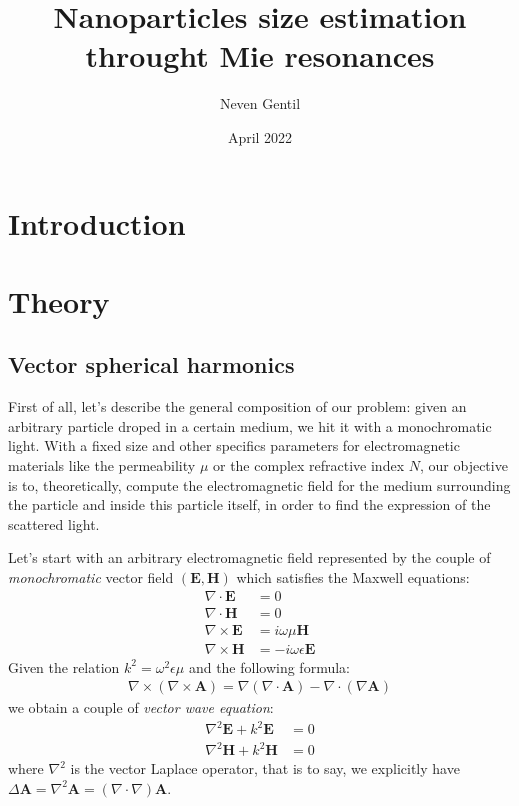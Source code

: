 \documentclass{article}
\title{Nanoparticles size estimation throught Mie resonances}
\author{Neven Gentil}
\date{April 2022}
\numberwithin{equation}{section}
\begin{document}
\maketitle

\twocolumn

\section{Introduction}

\section{Theory}

\subsection{Vector spherical harmonics}

First of all, let's describe the general composition of our problem: given an arbitrary particle droped in a certain medium, we hit it with a monochromatic light. With a fixed size and other specifics parameters for electromagnetic materials like the permeability $\mu$ or the complex refractive index $N$, our objective is to, theoretically, compute the electromagnetic field for the medium surrounding the particle and inside this particle itself, in order to find the expression of the scattered light.

Let's start with an arbitrary electromagnetic field represented by the couple of \textit{monochromatic} vector field $(\textbf{E}, \textbf{H})$ which satisfies the Maxwell equations:
\begin{align}
\nabla \cdot \textbf{E} &= 0\\
\nabla \cdot \textbf{H} &= 0\\
\nabla \times \textbf{E} &= i\omega \mu \textbf{H} \label{eq:rot_e} \\
\nabla \times \textbf{H} &= -i\omega \epsilon \textbf{E} \label{eq:rot_h}
\end{align}
Given the relation $k^{2} = \omega ^{2}\epsilon \mu$ and the following formula:
\begin{align}\label{eq:rot_rot_a}
\nabla \times (\nabla \times \textbf{A}) = \nabla (\nabla \cdot \textbf{A}) - \nabla \cdot (\nabla \textbf{A})
\end{align}
we obtain a couple of \textit{vector wave equation}:
\begin{align}
\nabla ^{2} \textbf{E} + k^{2}\textbf{E}&=0\\
\nabla ^{2} \textbf{H} + k^{2}\textbf{H}&=0
\end{align}
where $\nabla ^{2}$ is the vector Laplace operator, that is to say, we explicitly have $\Delta \textbf{A} = \nabla ^{2} \textbf{A} = (\nabla \cdot \nabla) \textbf{A}$.
\end{document}
